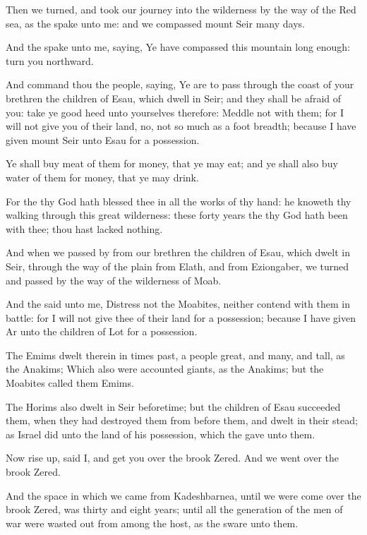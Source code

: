 \Chapter
\Verse Then we turned, and took our journey into the wilderness by the way of the Red sea, as the \LORD spake unto me: and we compassed mount Seir many days.

\Verse And the \LORD spake unto me, saying, \Verse Ye have compassed this mountain long enough: turn you northward.

\Verse And command thou the people, saying, Ye are to pass through the coast of your brethren the children of Esau, which dwell in Seir; and they shall be afraid of you: take ye good heed unto yourselves therefore: \Verse Meddle not with them; for I will not give you of their land, no, not so much as a foot breadth; because I have given mount Seir unto Esau for a possession.

\Verse Ye shall buy meat of them for money, that ye may eat; and ye shall also buy water of them for money, that ye may drink.

\Verse For the \LORD thy God hath blessed thee in all the works of thy hand: he knoweth thy walking through this great wilderness: these forty years the \LORD thy God hath been with thee; thou hast lacked nothing.

\Verse And when we passed by from our brethren the children of Esau, which dwelt in Seir, through the way of the plain from Elath, and from Eziongaber, we turned and passed by the way of the wilderness of Moab.

\Verse And the \LORD said unto me, Distress not the Moabites, neither contend with them in battle: for I will not give thee of their land for a possession; because I have given Ar unto the children of Lot for a possession.

\Verse The Emims dwelt therein in times past, a people great, and many, and tall, as the Anakims; \Verse Which also were accounted giants, as the Anakims; but the Moabites called them Emims.

\Verse The Horims also dwelt in Seir beforetime; but the children of Esau succeeded them, when they had destroyed them from before them, and dwelt in their stead; as Israel did unto the land of his possession, which the \LORD gave unto them.

\Verse Now rise up, said I, and get you over the brook Zered. And we went over the brook Zered.

\Verse And the space in which we came from Kadeshbarnea, until we were come over the brook Zered, was thirty and eight years; until all the generation of the men of war were wasted out from among the host, as the \LORD sware unto them.

